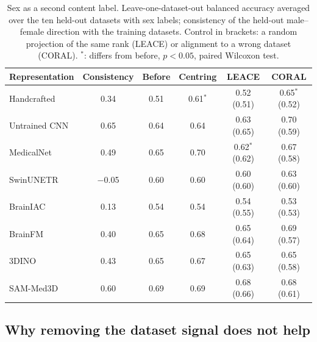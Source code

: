 \documentclass[11pt]{article}
\begin{document}
\begin{table}[t]
\centering
\small
\caption{Sex as a second content label. Leave-one-dataset-out balanced
accuracy averaged over the ten held-out datasets with sex labels; consistency
of the held-out male--female direction with the training datasets. Control in
brackets: a random projection of the same rank (LEACE) or alignment to a wrong
dataset (CORAL). $^{*}$: differs from before, $p<0.05$, paired Wilcoxon test.}
\label{tab:sex}
\begin{tabular}{l c c c c c}
\toprule
\textbf{Representation} & \textbf{Consistency} & \textbf{Before} & \textbf{Centring} & \textbf{LEACE} & \textbf{CORAL} \\
\midrule
Handcrafted   & 0.34 & 0.51 & 0.61$^{*}$ & 0.52 (0.51) & 0.65$^{*}$ (0.52) \\
Untrained CNN & 0.65 & 0.64 & 0.64 & 0.63 (0.65) & 0.70 (0.59) \\
MedicalNet    & 0.49 & 0.65 & 0.70 & 0.62$^{*}$ (0.62) & 0.67 (0.58) \\
SwinUNETR     & $-$0.05 & 0.60 & 0.60 & 0.60 (0.60) & 0.63 (0.60) \\
\midrule
BrainIAC      & 0.13 & 0.54 & 0.54 & 0.54 (0.55) & 0.53 (0.53) \\
BrainFM       & 0.40 & 0.65 & 0.68 & 0.65 (0.64) & 0.69 (0.57) \\
\midrule
3DINO         & 0.43 & 0.65 & 0.67 & 0.65 (0.63) & 0.65 (0.58) \\
SAM-Med3D     & 0.60 & 0.69 & 0.69 & 0.68 (0.66) & 0.68 (0.61) \\
\bottomrule
\end{tabular}
\end{table}

\subsection{Why removing the dataset signal does not help}
\label{sec:removal}
\end{document}
